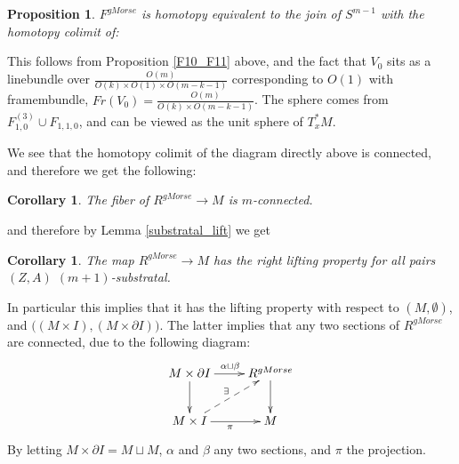 \documentclass{article}
\newtheorem{proposition}[theorem]{Proposition}
\newtheorem{corollary}[theorem]{Corollary}
\newtheorem{proposed work}[theorem]{Proposed Work}
\newcommand{\xymat}[1]{\begin{align*}\xymatrix{ #1}\end{align*}}
\begin{document}
\begin{proposition}
$F^{gMorse}$ is homotopy equivalent to the join of $S^{m-1}$ with  the homotopy colimit of:\\
\begin{center}
	\end{center}
\end{proposition}
This follows from Proposition \ref{F10_F11} above, and the fact that $V_0$ sits as a linebundle over $\frac{O(m)}{O(k)\times O(1)\times O(m-k-1)}$ corresponding to $O(1)$ with framembundle, $Fr(V_0)=\frac{O(m)}{O(k)\times O(m-k-1)}$. The sphere comes from $F_{1,0}^{(3)}\cup F_{1,1,0}$, and can be viewed as the unit sphere of $T_x^*M$.

We see that the homotopy colimit of the diagram directly above is connected, and therefore we get the following:
\begin{corollary}
The fiber of $R^{gMorse}\to M$ is $m$-connected.
\end{corollary}
and therefore by Lemma \ref{substratal_lift} we get
\begin{corollary}
The map $R^{gMorse}\to M$ has the right lifting property for all pairs $(Z,A)$ $(m+1)$-substratal.
\end{corollary}
In particular this implies that it has the lifting property with respect to $(M,\emptyset)$, and $\big((M\times I),(M\times \partial I) \big)$. The latter implies that any two sections of $R^{gMorse}$ are connected, due to the following diagram:
\xymat{M\times \partial I \ar[r]^{\alpha \sqcup \beta} \ar[d] & R^{gMorse}  \ar[d] \\
M\times I \ar[r]_\pi \ar@{-->}[ur]^{\exists}& M}
By letting $M\times \partial I=M\sqcup M$, $\alpha$ and $\beta$ any two sections, and $\pi$ the projection.
\end{document}
